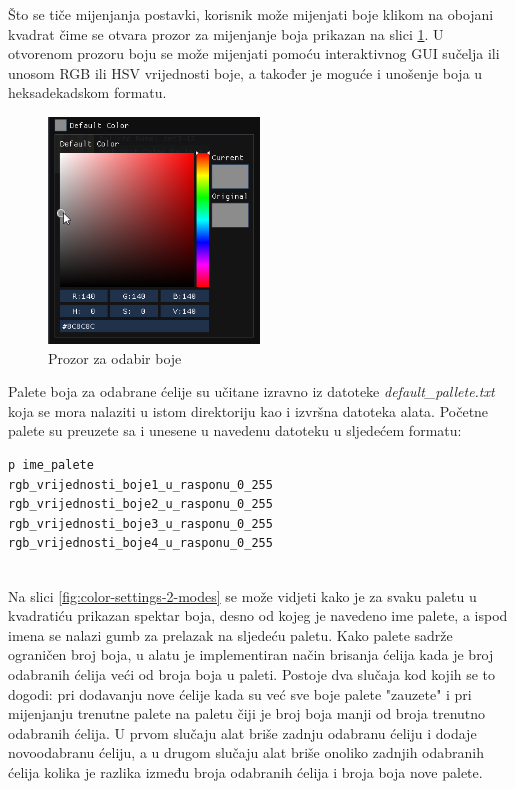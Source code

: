 \documentclass[times, utf8, diplomski]{fer}
\begin{document}
Što se tiče mijenjanja postavki, korisnik može mijenjati boje klikom na obojani kvadrat čime se otvara prozor za mijenjanje boja prikazan na slici \ref{fig:color-picker}. U otvorenom prozoru boju se može mijenjati pomoću interaktivnog GUI sučelja ili unosom RGB ili HSV vrijednosti boje, a također je moguće i unošenje boja u heksadekadskom formatu.\\

\begin{figure} [H]
	\centering
    \includegraphics[width=0.5\textwidth]{color_settings_color_picker.png}
    \caption{Prozor za odabir boje\\}
    \label{fig:color-picker}
\end{figure}

Palete boja za odabrane ćelije su učitane izravno iz datoteke \textit{default\_pallete.txt} koja se mora nalaziti u istom direktoriju kao i izvršna datoteka alata. Početne palete su preuzete sa \citep{colorbrewer} i unesene u navedenu datoteku u sljedećem formatu:

\begin{lstlisting}
p ime_palete
rgb_vrijednosti_boje1_u_rasponu_0_255
rgb_vrijednosti_boje2_u_rasponu_0_255
rgb_vrijednosti_boje3_u_rasponu_0_255
rgb_vrijednosti_boje4_u_rasponu_0_255
\end{lstlisting}
\ \\

Na slici \ref{fig:color-settings-2-modes} se može vidjeti kako je za svaku paletu u kvadratiću prikazan spektar boja, desno od kojeg je navedeno ime palete, a ispod imena se nalazi gumb za prelazak na sljedeću paletu. Kako palete sadrže ograničen broj boja, u alatu je implementiran način brisanja ćelija kada je broj odabranih ćelija veći od broja boja u paleti. Postoje dva slučaja kod kojih se to dogodi: pri dodavanju nove ćelije kada su već sve boje palete "zauzete" i pri mijenjanju trenutne palete na paletu čiji je broj boja manji od broja trenutno odabranih ćelija. U prvom slučaju alat briše zadnju odabranu ćeliju i dodaje novoodabranu ćeliju, a u drugom slučaju alat briše onoliko zadnjih odabranih ćelija kolika je razlika između broja odabranih ćelija i broja boja nove palete.\\
\end{document}
